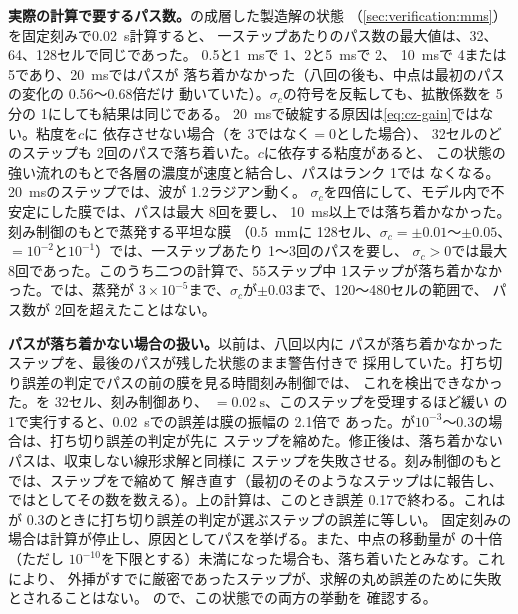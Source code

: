 \textbf{実際の計算で要するパス数。}の成層した製造解の状態
（\cref{sec:verification:mms}）を固定刻みで\SI{0.02}{\second}計算すると、
一ステップあたりのパス数の最大値は、32、64、128セルで同じであった。
0.5と\SI{1}{\milli\second}で 1、2と\SI{5}{\milli\second}で 2、
\SI{10}{\milli\second}で 4または 5であり、\SI{20}{\milli\second}ではパスが
落ち着かなかった（八回の後も、中点は最初のパスの変化の 0.56～0.68倍だけ
動いていた）。$\sigma_c$の符号を反転しても、拡散係数を 5分の 1にしても結果は同じである。
\SI{20}{\milli\second}で破綻する原因は\cref{eq:cz-gain}ではない。粘度を$c$に
依存させない場合（を 3ではなく$=0$とした場合）、
32セルのどのステップも 2回のパスで落ち着いた。$c$に依存する粘度があると、
この状態の強い流れのもとで各層の濃度が速度と結合し、パスはランク 1では
なくなる。\SI{20}{\milli\second}のステップでは、波が 1.2ラジアン動く。
$\sigma_c$を四倍にして、モデル内で不安定にした膜では、パスは最大 8回を要し、
\SI{10}{\milli\second}以上では落ち着かなかった。刻み制御のもとで蒸発する平坦な膜
（\SI{0.5}{\milli\metre}に 128セル、$\sigma_c = \pm0.01$～$\pm0.05$、
 $=10^{-2}$と$10^{-1}$）では、一ステップあたり 1～3回のパスを要し、
$\sigma_c > 0$では最大 8回であった。このうち二つの計算で、55ステップ中
1ステップが落ち着かなかった。では、蒸発が
$3\times10^{-5}$まで、$\sigma_c$が$\pm0.03$まで、120～480セルの範囲で、
パス数が 2回を超えたことはない。

\textbf{パスが落ち着かない場合の扱い。}以前は、八回以内に
パスが落ち着かなかったステップを、最後のパスが残した状態のまま警告付きで
採用していた。打ち切り誤差の判定でパスの前の膜を見る時間刻み制御では、
これを検出できなかった。を 32セル、刻み制御あり、
 $=\SI{0.02}{\second}$、このステップを受理するほど緩い
の 1で実行すると、\SI{0.02}{\second}での誤差は膜の振幅の 2.1倍で
あった。が$10^{-3}$～0.3の場合は、打ち切り誤差の判定が先に
ステップを縮めた。修正後は、落ち着かないパスは、収束しない線形求解と同様に
ステップを失敗させる。刻み制御のもとでは、ステップをで縮めて
解き直す（最初のそのようなステップはに報告し、
ではとしてその数を数える）。上の計算は、このとき誤差 0.17で終わる。これは
が 0.3のときに打ち切り誤差の判定が選ぶステップの誤差に等しい。
固定刻みの場合は計算が停止し、原因としてパスを挙げる。また、中点の移動量が
の十倍（ただし
$10^{-10}$を下限とする）未満になった場合も、落ち着いたとみなす。これにより、
外挿がすでに厳密であったステップが、求解の丸め誤差のために失敗とされることはない。
ので、この状態での両方の挙動を
確認する。

